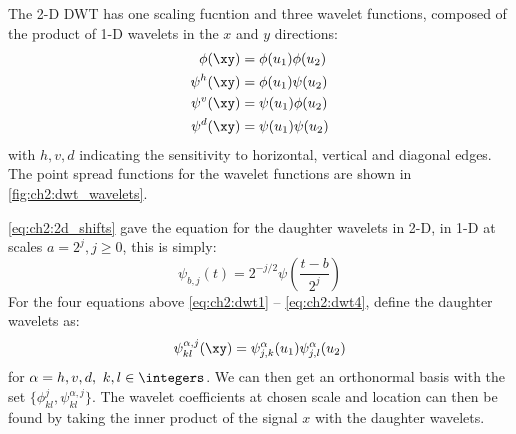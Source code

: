   The 2-D DWT has one scaling fucntion and three wavelet functions, composed of
  the product of 1-D wavelets in the $x$ and $y$ directions:
  \begin{align}
    \phi(\xy) &= \phi(u_1)\phi(u_2) \label{eq:ch2:dwt1}\\
    \psi^h(\xy) &= \phi(u_1) \psi(u_2) \\
    \psi^v(\xy) & = \psi(u_1) \phi(u_2) \\
    \psi^d(\xy) & = \psi(u_1) \psi(u_2) \label{eq:ch2:dwt4}
  \end{align}
  with $h, v, d$ indicating the sensitivity to horizontal, vertical and diagonal
  edges. The point spread functions for the wavelet functions are shown in \autoref{fig:ch2:dwt_wavelets}.
  
  \eqref{eq:ch2:2d_shifts} gave the equation for the daughter wavelets in 2-D,
  in 1-D at scales $a=2^j, j \geq 0$, this is simply:
  \begin{equation}
    \psi_{b, j}(t) = 2^{-j/2} \psi\left(\frac{t-b}{2^j} \right)
  \end{equation}
  For the four equations above \eqref{eq:ch2:dwt1} -- \eqref{eq:ch2:dwt4},
  define the daughter wavelets as:
  \begin{equation}
    \psi_{kl}^{\alpha, j}(\xy) = \psi^\alpha_{j,k}(u_1)\psi^\alpha_{j,l}(u_2)
  \end{equation}
  for $\alpha = h, v, d,\ k,l \in \integers$. We can then get an orthonormal
  basis with the set $\{ \phi^j_{kl}, \psi^{\alpha,j}_{kl} \}$.
  The wavelet coefficients at chosen scale and location can then be found by
  taking the inner product of the signal $x$ with the daughter wavelets.


